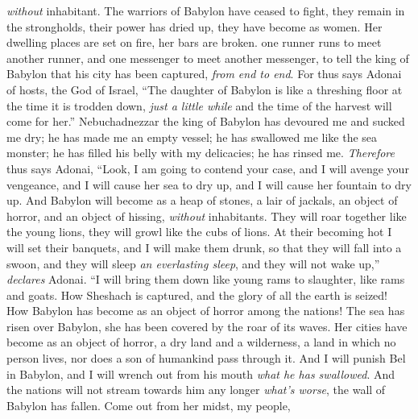 \begin{biblechapter}
\textit{without} inhabitant.
\verse The warriors of Babylon have ceased to fight, 
they remain in the strongholds, 
their power has dried up, 
they have become as women. 
Her dwelling places are set on fire, 
her bars are broken.
\verse one runner runs to meet another runner, 
and one messenger to meet another messenger, 
to tell the king of Babylon that his city has been captured, 
\textit{from end to end}.
\verse For thus says Adonai of hosts, the God of Israel,
\verse “The daughter of Babylon is like a threshing floor 
at the time it is trodden down, 
\textit{just a little while} 
and the time of the harvest will come for her.”
\verse Nebuchadnezzar the king of Babylon 
has devoured me and sucked me dry; 
he has made me an empty vessel; 
he has swallowed me like the sea monster; 
he has filled his belly with my delicacies; 
he has rinsed me.
\verse \textit{Therefore} thus says Adonai,
\verse “Look, I am going to contend your case, 
and I will avenge your vengeance, 
and I will cause her sea to dry up, 
and I will cause her fountain to dry up.
\verse And Babylon will become as a heap of stones, 
a lair of jackals, 
an object of horror, and an object of hissing, 
\textit{without} inhabitants.
\verse They will roar together like the young lions, 
they will growl like the cubs of lions.
\verse At their becoming hot I will set their banquets, 
and I will make them drunk, 
so that they will fall into a swoon, 
and they will sleep \textit{an everlasting sleep}, 
and they will not wake up,” \textit{declares} Adonai.
\verse “I will bring them down like young rams to slaughter, 
like rams and goats.
\verse How Sheshach is captured, 
and the glory of all the earth is seized! 
How Babylon has become as an object of horror 
among the nations!
\verse The sea has risen over Babylon, 
she has been covered by the roar of its waves.
\verse Her cities have become as an object of horror, 
a dry land and a wilderness, 
a land in which no person lives, 
nor does a son of humankind pass through it.
\verse And I will punish Bel in Babylon, 
and I will wrench out from his mouth \textit{what he has swallowed}. 
And the nations will not stream towards him any longer 
\textit{what’s worse}, the wall of Babylon has fallen.
\verse Come out from her midst, my people, 

\end{biblechapter}
